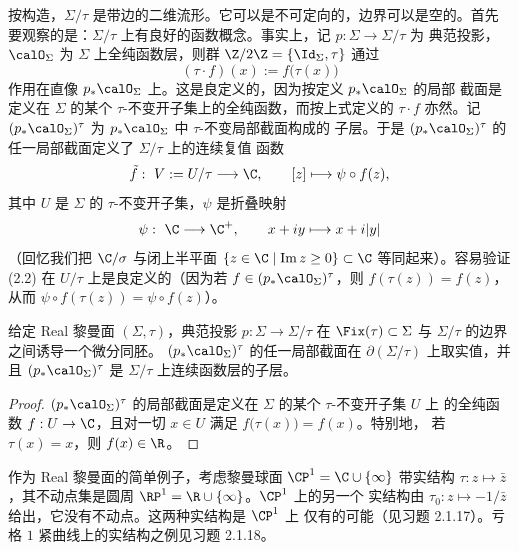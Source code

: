 按构造，$\Sigma/\tau$ 是带边的二维流形。它可以是不可定向的，边界可以是空的。首先
要观察的是：$\Sigma/\tau$ 上有良好的函数概念。事实上，记 $p:\Sigma\to\Sigma/\tau$ 为
典范投影，$\calO_\Sigma$ 为 $\Sigma$ 上全纯函数层，则群
$\Z/2\Z=\{\Id_\Sigma,\tau\}$ 通过
\begin{equation}\label{eq:2.1}
(\tau\cdot f)(x):=f\bigl(\tau(x)\bigr)
\end{equation}
作用在直像 $p_*\calO_\Sigma$ 上。这是良定义的，因为按定义 $p_*\calO_\Sigma$ 的局部
截面是定义在 $\Sigma$ 的某个 $\tau$-不变开子集上的全纯函数，而按上式定义的 $\tau\cdot f$
亦然。记 $(p_*\calO_\Sigma)^\tau$ 为 $p_*\calO_\Sigma$ 中 $\tau$-不变局部截面构成的
子层。于是 $(p_*\calO_\Sigma)^\tau$ 的任一局部截面定义了 $\Sigma/\tau$ 上的连续复值
函数
\begin{equation}\label{eq:2.2}
\tilde f:\ V:=U/\tau\longrightarrow\C,\qquad [z]\longmapsto\psi\circ f(z),
\end{equation}
其中 $U$ 是 $\Sigma$ 的 $\tau$-不变开子集，$\psi$ 是折叠映射
\begin{equation}\label{eq:2.3}
\psi:\ \C\longrightarrow\C^+,\qquad x+iy\longmapsto x+i|y|
\end{equation}
（回忆我们把 $\C/\sigma$ 与闭上半平面 $\{z\in\C\mid\operatorname{Im}z\ge0\}\subset\C$
等同起来）。容易验证 (2.2) 在 $U/\tau$ 上是良定义的（因为若
$f\in(p_*\calO_\Sigma)^\tau$，则 $f(\tau(z))=f(z)$，从而
$\psi\circ f(\tau(z))=\psi\circ f(z)$）。

\begin{proposition}\label{prop:2.1.2}
给定 Real 黎曼面 $(\Sigma,\tau)$，典范投影 $p:\Sigma\to\Sigma/\tau$ 在
$\Fix(\tau)\subset\Sigma$ 与 $\Sigma/\tau$ 的边界之间诱导一个微分同胚。
$(p_*\calO_\Sigma)^\tau$ 的任一局部截面在 $\partial(\Sigma/\tau)$ 上取实值，并且
$(p_*\calO_\Sigma)^\tau$ 是 $\Sigma/\tau$ 上连续函数层的子层。
\end{proposition}

\begin{proof}
$(p_*\calO_\Sigma)^\tau$ 的局部截面是定义在 $\Sigma$ 的某个 $\tau$-不变开子集 $U$ 上
的全纯函数 $f:U\to\C$，且对一切 $x\in U$ 满足 $f\bigl(\tau(x)\bigr)=f(x)$。特别地，
若 $\tau(x)=x$，则 $f(x)\in\R$。
\end{proof}

作为 Real 黎曼面的简单例子，考虑黎曼球面 $\CP^1=\C\cup\{\infty\}$ 带实结构
$\tau:z\mapsto\bar z$，其不动点集是圆周 $\RP^1=\R\cup\{\infty\}$。$\CP^1$ 上的另一个
实结构由 $\tau_0:z\mapsto-1/\bar z$ 给出，它没有不动点。这两种实结构是 $\CP^1$ 上
仅有的可能（见习题 2.1.17）。亏格 $1$ 紧曲线上的实结构之例见习题 2.1.18。

